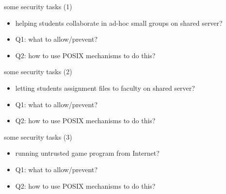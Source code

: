 \begin{frame}[label=secTasks1]{some security tasks (1)}
    \begin{itemize}
    \item helping students collaborate in ad-hoc small groups on shared server?
    \vspace{.5cm}
    \item Q1: what to allow/prevent?
    \item Q2: how to use POSIX mechanisms to do this?
    \end{itemize}
\end{frame}

\begin{frame}[label=secTasks2]{some security tasks (2)}
    \begin{itemize}
    \item letting students assignment files to faculty on shared server?
    \vspace{.5cm}
    \item Q1: what to allow/prevent?
    \item Q2: how to use POSIX mechanisms to do this?
    \end{itemize}
\end{frame}

\begin{frame}[label=secTasks3]{some security tasks (3)}
    \begin{itemize}
    \item running untrusted game program  from Internet?
    \vspace{.5cm}
    \item Q1: what to allow/prevent?
    \item Q2: how to use POSIX mechanisms to do this?
    \end{itemize}
\end{frame}
